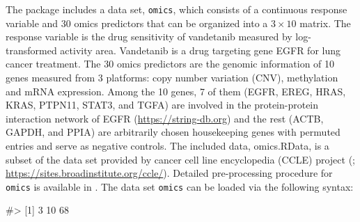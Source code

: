 The package  includes a data set, \texttt{omics},
which consists of a continuous response variable and 30 omics predictors
that can be organized into a \(3\times 10\) matrix. The response
variable is the drug sensitivity of vandetanib measured by
log-transformed activity area. Vandetanib is a drug targeting gene EGFR
for lung cancer treatment. The 30 omics predictors are the genomic
information of 10 genes measured from 3 platforms: copy number variation
(CNV), methylation and mRNA expression. Among the 10 genes, 7 of them
(EGFR, EREG, HRAS, KRAS, PTPN11, STAT3, and TGFA) are involved in the
protein-protein interaction network of EGFR
(\url{https://string-db.org}) and the rest (ACTB, GAPDH, and PPIA) are
arbitrarily chosen housekeeping genes with permuted entries and serve as
negative controls. The included data, omics.RData, is a subset of the
data set provided by cancer cell line encyclopedia (CCLE) project
(\citet{Barretina2012CCLE};
\url{https://sites.broadinstitute.org/ccle/}). Detailed pre-processing
procedure for \texttt{omics} is available in
\citep{ChangYang2021bioinformatics}. The data set \texttt{omics} can be
loaded via the following syntax:

\begin{Schunk}
\begin{Soutput}
#> [1]  3 10 68
\end{Soutput}
\end{Schunk}

